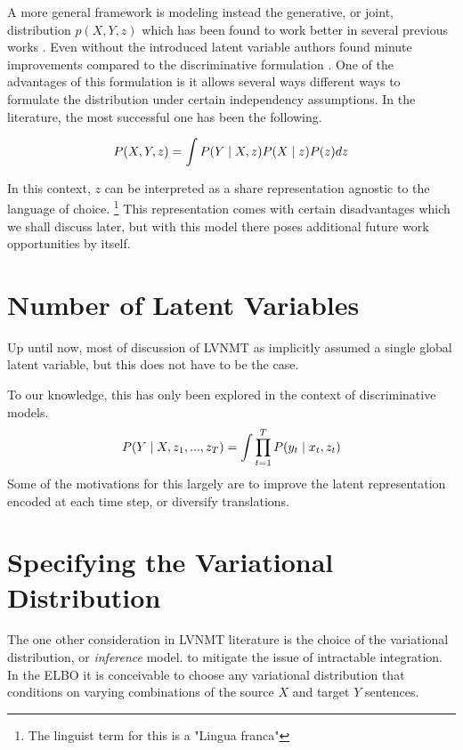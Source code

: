A more general framework is modeling instead the generative, or joint, distribution $p(X,Y,z)$ which has been found to work better in several previous works \cite{harshil2018GNMT,eikema2018AEVNMT}. Even without the introduced latent variable authors found minute improvements compared to the discriminative formulation \cite{eikema2018AEVNMT}. One of the advantages of this formulation is it allows several ways different ways to formulate the distribution under certain independency assumptions. In the literature, the most successful one has been the following.

\begin{equation}
P(X, Y, z) = \int P(Y \; | \;{X, z}) P(X \; | \;{z}) P(z) dz	
\end{equation}

In this context, $z$ can be interpreted as a share representation agnostic to the language of choice. \footnote{The linguist term for this is a "Lingua franca"} This representation comes with certain disadvantages which we shall discuss later, but with this model there poses additional future work opportunities by itself. 


\section{Number of Latent Variables}
Up until now, most of discussion of \ac{LVNMT} as implicitly assumed a single global latent variable, but this does not have to be the case. 

To our knowledge, this has only been explored in the context of discriminative models.
\begin{equation}
P(Y \; | \;{X, z_{1}, ..., z_{T}}) = \int \prod_{t=1}^{T} P(y_{t} \; | \;{x_{t}, z_{t}})
\end{equation}
Some of the motivations for this largely are to improve the latent representation encoded at each time step, or diversify translations.

\section{Specifying the Variational Distribution}

The one other consideration in \ac{LVNMT} literature is the choice of the variational distribution, or \textit{inference} model. to mitigate the issue of intractable integration. In the \ac{ELBO} it is conceivable to choose any variational distribution that conditions on varying combinations of the source $X$ and target $Y$ sentences. 

